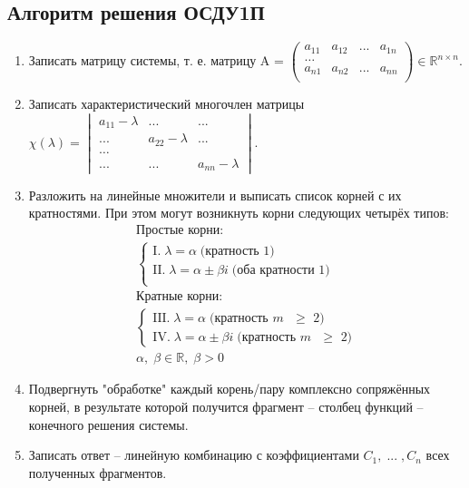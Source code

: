 \documentclass[10pt, a4paper]{article}
\begin{document}
\subsection{Алгоритм решения ОСДУ1П}
\begin{enumerate}
    \item Записать матрицу системы, т. е. матрицу A =
    $\begin{pmatrix}
        a_{11} & a_{12} & ... & a_{1n} \\
        \dots \\
        a_{n1} & a_{n2} & ... & a_{nn} \\
    \end{pmatrix}
    \in \mathbb{R}^{n \times n}.$
    \item Записать характеристический многочлен матрицы $\chi(\lambda) =
    \begin{vmatrix}
        a_{11} - \lambda & ... & ... \\
        ... & a_{22} - \lambda & ... \\
        \dots \\
        ... & ... & a_{nn} - \lambda
    \end{vmatrix}$.
    \item Разложить на линейные множители и выписать список корней с их кратностями. При этом могут возникнуть корни следующих четырёх типов:
    \begin{gather*}
        \text{Простые корни:} \\
            \begin{cases}
                \text{I.} \; \lambda = \alpha \; \text{(кратность 1)} \\
                \text{II.} \; \lambda = \alpha \pm \beta i \; \text{(оба кратности 1)} \\
            \end{cases} \\
        \text{Кратные корни:} \\
            \begin{cases}
                \text{III.} \; \lambda = \alpha \; \text{(кратность $m$ $\geq$ 2)} \\
                \text{IV.} \; \lambda = \alpha \pm \beta i \; \text{(кратность $m$ $\geq$ 2)}
            \end{cases} \\
        \alpha, \; \beta \in \mathbb{R}, \; \beta > 0
    \end{gather*}
    \item Подвергнуть "обработке" каждый корень/пару комплексно сопряжённых корней, в результате которой получится фрагмент -- столбец функций -- конечного решения системы.
    \item Записать ответ -- линейную комбинацию с коэффициентами $C_1, \; ... \;, C_n$ всех полученных фрагментов.
\end{enumerate}
\end{document}
